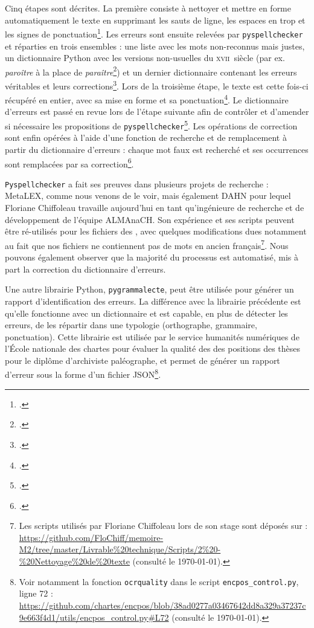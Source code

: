Cinq étapes sont décrites. La première consiste à nettoyer et mettre en forme automatiquement le texte en supprimant les sauts de ligne, les espaces en trop et les signes de ponctuation\footcite[p. 54 et 60]{chiffoleau}. Les erreurs sont ensuite relevées par \texttt{pyspellchecker} et réparties en trois ensembles : une liste avec les mots non-reconnus mais justes, un dictionnaire Python avec les versions non-usuelles du \textsc{xvii}\ieme~siècle (par ex. \textit{paroître} à la place de \textit{paraître}\footcite[p. 57]{chiffoleau}) et un dernier dictionnaire contenant les erreurs véritables et leurs corrections\footcite[p. 59-60]{chiffoleau}. Lors de la troisième étape, le texte est cette fois-ci récupéré en entier, avec sa mise en forme et sa ponctuation\footcite[p. 61]{chiffoleau}. Le dictionnaire d'erreurs est passé en revue lors de l'étape suivante afin de contrôler et d'amender si nécessaire les propositions de \texttt{pyspellchecker}\footcite[p. 61-63]{chiffoleau}. Les opérations de correction sont enfin opérées à l'aide d'une fonction de recherche et de remplacement à partir du dictionnaire d'erreurs : chaque mot faux est recherché et ses occurrences sont remplacées par sa correction\footcite[p. 63-64]{chiffoleau}.

\texttt{Pyspellchecker} a  fait ses preuves dans plusieurs projets de recherche : MetaLEX, comme nous venons de le voir, mais également DAHN pour lequel Floriane Chiffoleau travaille aujourd'hui en tant qu'ingénieure de recherche et de développement de l'équipe ALMAnaCH. Son expérience et ses scripts peuvent être ré-utilisés pour les fichiers des \odm{}, avec quelques modifications dues notamment au fait que nos fichiers ne contiennent pas de mots en ancien français\footnote{Les scripts utilisés par Floriane Chiffoleau lors de son stage sont déposés sur \github{} : \url{https://github.com/FloChiff/memoire-M2/tree/master/Livrable\%20technique/Scripts/2\%20-\%20Nettoyage\%20de\%20texte} (consulté le \today).}. Nous pouvons également observer que la majorité du processus est automatisé, mis à part la correction du dictionnaire d'erreurs.

Une autre librairie Python, \texttt{pygrammalecte}, peut être utilisée pour générer un rapport d'identification des erreurs. La différence avec la librairie précédente est qu'elle fonctionne avec un dictionnaire et est capable, en plus de détecter les erreurs, de les répartir dans une typologie (orthographe, grammaire, ponctuation). Cette librairie est utilisée par le service humanités numériques de l'École nationale des chartes pour évaluer la qualité des \ocr{} des positions des thèses pour le diplôme d'archiviste paléographe, et permet de générer un rapport d'erreur sous la forme d'un fichier JSON\footnote{Voir notamment la fonction \texttt{ocrquality} dans le script \texttt{encpos\_control.py}, ligne 72 : \url{https://github.com/chartes/encpos/blob/38ad0277a03467642dd8a329a37237c9e663f4d1/utils/encpos_control.py\#L72} (consulté le \today).}.

